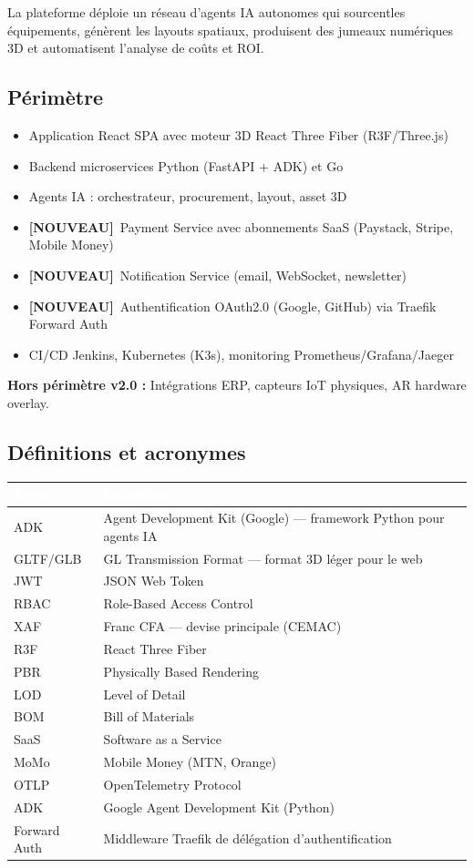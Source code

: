 \documentclass[12pt,a4paper]{article}
\newcommand{\NEW}{\textcolor{daedalusgold}{\textbf{[NOUVEAU]}}}
\begin{document}
La plateforme déploie un réseau d'agents IA autonomes qui sourcentles équipements, génèrent les layouts spatiaux, produisent des jumeaux numériques 3D et automatisent l'analyse de coûts et ROI.

\subsection{Périmètre}
\begin{itemize}
  \item Application React SPA avec moteur 3D React Three Fiber (R3F/Three.js)
  \item Backend microservices Python (FastAPI + ADK) et Go
  \item Agents IA : orchestrateur, procurement, layout, asset 3D
  \item \NEW\ Payment Service avec abonnements SaaS (Paystack, Stripe, Mobile Money)
  \item \NEW\ Notification Service (email, WebSocket, newsletter)
  \item \NEW\ Authentification OAuth2.0 (Google, GitHub) via Traefik Forward Auth
  \item CI/CD Jenkins, Kubernetes (K3s), monitoring Prometheus/Grafana/Jaeger
\end{itemize}

\noindent\textbf{Hors périmètre v2.0 :} Intégrations ERP, capteurs IoT physiques, AR hardware overlay.

\subsection{Définitions et acronymes}

\begin{tabularx}{\textwidth}{|l|X|}
\hline
\rowcolor{tablehead}\textcolor{white}{\textbf{Terme}} & \textcolor{white}{\textbf{Définition}} \\
\hline
ADK & Agent Development Kit (Google) — framework Python pour agents IA \\
GLTF/GLB & GL Transmission Format — format 3D léger pour le web \\
JWT & JSON Web Token \\
RBAC & Role-Based Access Control \\
XAF & Franc CFA — devise principale (CEMAC) \\
R3F & React Three Fiber \\
PBR & Physically Based Rendering \\
LOD & Level of Detail \\
BOM & Bill of Materials \\
SaaS & Software as a Service \\
MoMo & Mobile Money (MTN, Orange) \\
OTLP & OpenTelemetry Protocol \\
ADK & Google Agent Development Kit (Python) \\
Forward Auth & Middleware Traefik de délégation d'authentification \\
\hline
\end{tabularx}
\end{document}
